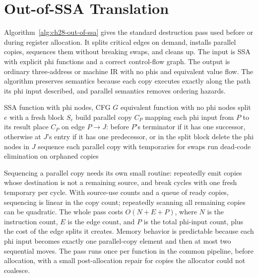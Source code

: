 \section{Out-of-SSA Translation}\label{sec:ch28-algorithm}

Algorithm~\ref{alg:ch28-out-of-ssa} gives the standard destruction pass used before or during register allocation.
It splits critical edges on demand, installs parallel copies, sequences them without breaking swaps, and cleans up.
The input is SSA with explicit phi functions and a correct control-flow graph.
The output is ordinary three-address or machine IR with no phis and equivalent value flow.
The algorithm preserves semantics because each copy executes exactly along the path its phi input described, and parallel semantics removes ordering hazards.

\begin{algorithm}[htbp]
\caption{Out-of-SSA translation with edge splitting}\label{alg:ch28-out-of-ssa}
\begin{pseudocode}
\Require SSA function with phi nodes, CFG $G$
\Ensure equivalent function with no phi nodes
\State split $e$ with a fresh block $S_e$
\EndFor
{}
\State build parallel copy $C_P$ mapping each phi input from $P$ to its result
\State place $C_P$ on edge $P\to J$: before $P$'s terminator if it has one successor, otherwise at $J$'s entry if it has one predecessor, or in the split block
\EndFor
\State delete the phi nodes in $J$
\EndFor
\State sequence each parallel copy with temporaries for swaps
\State run dead-code elimination on orphaned copies
\end{pseudocode}
\end{algorithm}

Sequencing a parallel copy needs its own small routine: repeatedly emit copies whose destination is not a remaining source, and break cycles with one fresh temporary per cycle.
With source-use counts and a queue of ready copies, sequencing is linear in the copy count; repeatedly scanning all remaining copies can be quadratic.
The whole pass costs $O(N + E + P)$, where $N$ is the instruction count, $E$ is the edge count, and $P$ is the total phi-input count, plus the cost of the edge splits it creates.
Memory behavior is predictable because each phi input becomes exactly one parallel-copy element and then at most two sequential moves.
The pass runs once per function in the common pipeline, before allocation, with a small post-allocation repair for copies the allocator could not coalesce.

